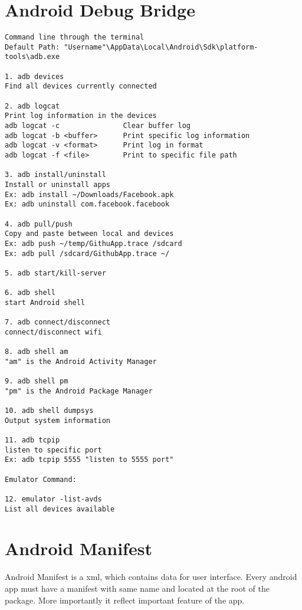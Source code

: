\documentclass[12pt]{article}
\begin{document}
\section{Android Debug Bridge}
\begin{verbatim}
Command line through the terminal
Default Path: "Username"\AppData\Local\Android\Sdk\platform-tools\adb.exe

1. adb devices
Find all devices currently connected

2. adb logcat
Print log information in the devices
adb logcat -c 				Clear buffer log
adb logcat -b <buffer> 		Print specific log information
adb logcat -v <format>	 	Print log in format
adb logcat -f <file> 		Print to specific file path

3. adb install/uninstall
Install or uninstall apps
Ex: adb install ~/Downloads/Facebook.apk
Ex: adb uninstall com.facebook.facebook

4. adb pull/push
Copy and paste between local and devices
Ex: adb push ~/temp/GithuApp.trace /sdcard
Ex: adb pull /sdcard/GithubApp.trace ~/

5. adb start/kill-server

6. adb shell
start Android shell

7. adb connect/disconnect
connect/disconnect wifi

8. adb shell am
"am" is the Android Activity Manager
 
9. adb shell pm
"pm" is the Android Package Manager

10. adb shell dumpsys
Output system information

11. adb tcpip
listen to specific port
Ex: adb tcpip 5555 "listen to 5555 port"

Emulator Command:

12. emulator -list-avds
List all devices available
\end{verbatim}
\section{Android Manifest}

Android Manifest is a xml, which contains data for user interface. Every android app must have a manifest with same name and located at the root of the package. More importantly 
it reflect important feature of the app.
\end{document}
